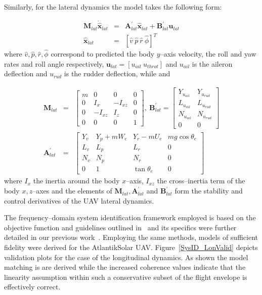Similarly, for the lateral dynamics the model takes the following form:

\small
\begin{eqnarray}\label{LAT_DYN}
 \mathbf{M}_{lat}\dot{\mathbf{\hat{x}}}_{lat} &=& \mathbf{A}^\prime_{lat}\mathbf{\hat{x}}_{lat}+\mathbf{B}^\prime_{lat}\mathbf{u}_{lat} \\ \nonumber
 \mathbf{\hat{x}}_{lat} &=& \left[\hat{v}~\hat{p}~\hat{r}~\hat{\phi} \right]^T
\end{eqnarray}
\normalsize
where $\hat{v},\hat{p},\hat{r},\hat{\phi}$ correspond to predicted the body $y$--axis velocity, the roll and yaw rates and roll angle respectively, $\mathbf{u}_{lat}=[u_{ail}~u_{throt}]$ and $u_{ail}$ is the aileron deflection and $u_{rud}$ is the rudder deflection, while and

\footnotesize
\begin{eqnarray}
\mathbf{M}_{lat} &=& \begin{bmatrix}
m & 0 & 0 & 0\\ 
0 & I_x & -I_{xz} & 0\\ 
0 & -I_{xz} & I_z & 0\\ 
0 & 0 & 0 & 1
\end{bmatrix},~ \mathbf{B}^\prime_{lat} = \begin{bmatrix}
Y_{u_{ail}} & Y_{u_{rud}}\\ 
L_{u_{ail}} & L_{u_{rud}}\\ 
N_{u_{ail}} & N_{u_{rud}}\\ 
0 & 0
\end{bmatrix}\\ \nonumber 
\mathbf{A}^\prime_{lat} &=& \begin{bmatrix}

Y_v & Y_p + mW_e & Y_r-mU_e & mg\cos\theta_e\\ 
L_v & L_p & L_r & 0\\ 
N_v & N_p & N_r & 0 \\ 
0 & 1 & \tan\theta_e & 0
\end{bmatrix}
\end{eqnarray}
\normalsize
where $I_x$ the inertia around the body $x$--axis, $I_{xz}$ the cross--inertia term of the body $x,z$--axes and the elements of $\mathbf{M}_{lat},\mathbf{A}^\prime_{lat}$ and $\mathbf{B}^\prime_{lat}$ form the stability and control derivatives of the UAV lateral dynamics. 

The frequency--domain system identification framework employed is based on the objective function and guidelines outlined in~\cite{TISCHLER_BOOK} and its specifics were further detailed in our previous work~\cite{OMLAS_MED_14}. Employing the same methods, models of sufficient fidelity were derived for the AtlantikSolar UAV. Figure~\ref{SysID_LonValid} depicts validation plots for the case of the longitudinal dynamics. As shown the model matching is  are derived while the increased coherence values indicate that the linearity assumption within such a conservative subset of the flight envelope is effectively correct. 

